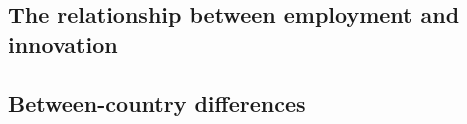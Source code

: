 \subsection{The relationship between employment and innovation}
\label{subsec:theory}


\subsection{Between-country differences}
\label{subsec:other_studies}
